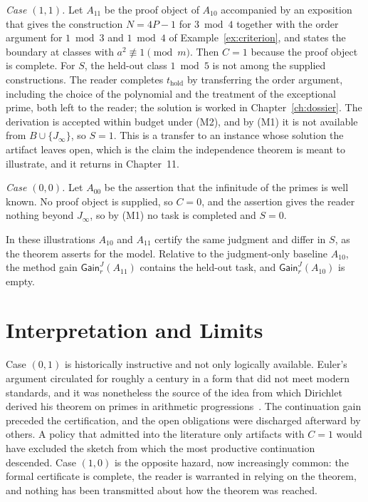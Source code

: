 \documentclass[11pt]{book}
\theoremstyle{definition}
\theoremstyle{remark}
\newcommand{\Gain}{\mathsf{Gain}}
\begin{document}
\emph{Case $(1,1)$.} Let $A_{11}$ be the proof object of $A_{10}$ accompanied by an exposition that gives the construction $N=4P-1$ for $3\bmod4$ together with the order argument for $1\bmod3$ and $1\bmod4$ of Example~\ref{ex:criterion}, and states the boundary at classes with $a^2\not\equiv1\pmod m$. Then $C=1$ because the proof object is complete. For $S$, the held-out class $1\bmod5$ is not among the supplied constructions. The reader completes $t_{\mathrm{hold}}$ by transferring the order argument, including the choice of the polynomial and the treatment of the exceptional prime, both left to the reader; the solution is worked in Chapter~\ref{ch:dossier}. The derivation is accepted within budget under (M2), and by (M1) it is not available from $B\cup\{J_\infty\}$, so $S=1$. This is a transfer to an instance whose solution the artifact leaves open, which is the claim the independence theorem is meant to illustrate, and it returns in Chapter~11.

\emph{Case $(0,0)$.} Let $A_{00}$ be the assertion that the infinitude of the primes is well known. No proof object is supplied, so $C=0$, and the assertion gives the reader nothing beyond $J_\infty$, so by (M1) no task is completed and $S=0$.

In these illustrations $A_{10}$ and $A_{11}$ certify the same judgment and differ in $S$, as the theorem asserts for the model. Relative to the judgment-only baseline $A_{10}$, the method gain $\Gain^J_r(A_{11})$ contains the held-out task, and $\Gain^J_r(A_{10})$ is empty.

\section{Interpretation and Limits}

Case $(0,1)$ is historically instructive and not only logically available. Euler's argument circulated for roughly a century in a form that did not meet modern standards, and it was nonetheless the source of the idea from which Dirichlet derived his theorem on primes in arithmetic progressions~\cite{dirichlet,euler}. The continuation gain preceded the certification, and the open obligations were discharged afterward by others. A policy that admitted into the literature only artifacts with $C=1$ would have excluded the sketch from which the most productive continuation descended. Case $(1,0)$ is the opposite hazard, now increasingly common: the formal certificate is complete, the reader is warranted in relying on the theorem, and nothing has been transmitted about how the theorem was reached.
\end{document}
